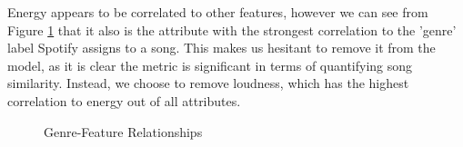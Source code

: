 \documentclass[conference]{IEEEtran}
\begin{document}
Energy appears to be correlated to other features, however we can see from Figure \ref{fig:feature-genre-corr} that it also is the attribute with the strongest correlation to the 'genre' label Spotify assigns to a song. This makes us hesitant to remove it from the model, as it is clear the metric is significant in terms of quantifying song similarity. Instead, we choose to remove loudness, which has the highest correlation to energy out of all attributes.

\begin{figure}[!ht]
    \begin{center}
    \end{center}
    \caption{Genre-Feature Relationships}
    \label{fig:feature-genre-corr}
\end{figure}
\end{document}
